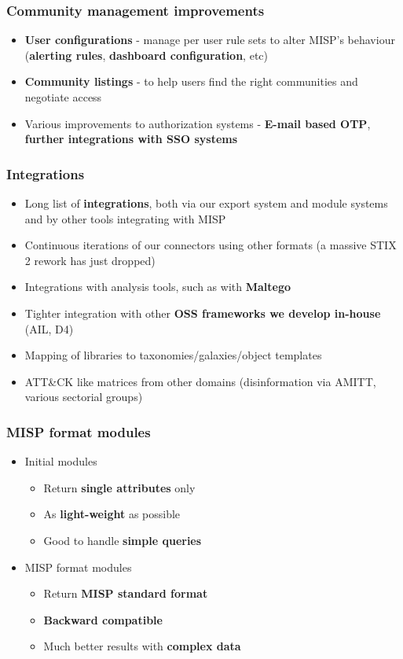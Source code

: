 \begin{frame}
\frametitle{Community management improvements}
\begin{itemize}
	\item {\bf User configurations} - manage per user rule sets to alter MISP's behaviour ({\bf alerting rules}, {\bf dashboard configuration}, etc)
        \item {\bf Community listings} - to help users find the right communities and negotiate access
        \item Various improvements to authorization systems - {\bf E-mail based OTP}, {\bf further integrations with SSO systems}
\end{itemize}
\end{frame}

\begin{frame}
\frametitle{Integrations}
\begin{itemize}
	\item Long list of {\bf integrations}, both via our export system and module systems and by other tools integrating with MISP
        \item Continuous iterations of our connectors using other formats (a massive STIX 2 rework has just dropped)
        \item Integrations with analysis tools, such as with {\bf Maltego}
        \item Tighter integration with other {\bf OSS frameworks we develop in-house} (AIL, D4)
        \item Mapping of libraries to taxonomies/galaxies/object templates
        \item ATT\&CK like matrices from other domains (disinformation via AMITT, various sectorial groups)
\end{itemize}
\end{frame}

\begin{frame}
\frametitle{MISP format modules}
\begin{itemize}
    \item Initial modules
    \begin{itemize}
        \item Return {\bf single attributes} only
        \item As {\bf light-weight} as possible
        \item Good to handle {\bf simple queries}
    \end{itemize}
    \item MISP format modules
    \begin{itemize}
        \item Return {\bf MISP standard format}
        \item {\bf Backward compatible}
        \item Much better results with {\bf complex data}
    \end{itemize}
\end{itemize}
\end{frame}

